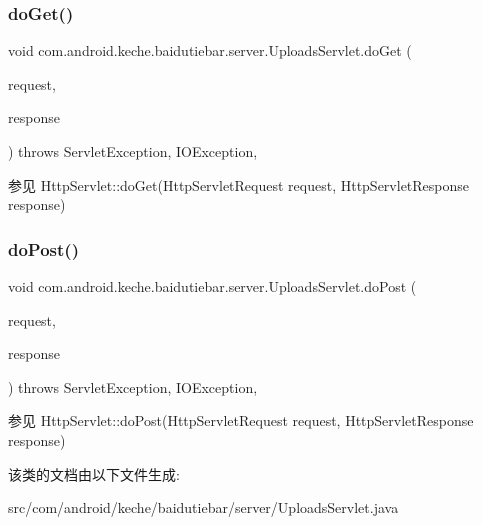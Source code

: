 \subsubsection{\texorpdfstring{do\+Get()}{doGet()}}
{\footnotesize\ttfamily void com.\+android.\+keche.\+baidutiebar.\+server.\+Uploads\+Servlet.\+do\+Get (\begin{DoxyParamCaption}\item[{Http\+Servlet\+Request}]{request,  }\item[{Http\+Servlet\+Response}]{response }\end{DoxyParamCaption}) throws Servlet\+Exception, I\+O\+Exception\hspace{0.3cm}{\ttfamily [inline]}, {\ttfamily [protected]}}

\begin{DoxySeeAlso}{参见}
Http\+Servlet\+::do\+Get(\+Http\+Servlet\+Request request, Http\+Servlet\+Response response) 
\end{DoxySeeAlso}
\mbox{\label{classcom_1_1android_1_1keche_1_1baidutiebar_1_1server_1_1_uploads_servlet_a8932c35f6e491f9b8a36f07bf494639d}} 
\subsubsection{\texorpdfstring{do\+Post()}{doPost()}}
{\footnotesize\ttfamily void com.\+android.\+keche.\+baidutiebar.\+server.\+Uploads\+Servlet.\+do\+Post (\begin{DoxyParamCaption}\item[{Http\+Servlet\+Request}]{request,  }\item[{Http\+Servlet\+Response}]{response }\end{DoxyParamCaption}) throws Servlet\+Exception, I\+O\+Exception\hspace{0.3cm}{\ttfamily [inline]}, {\ttfamily [protected]}}

\begin{DoxySeeAlso}{参见}
Http\+Servlet\+::do\+Post(\+Http\+Servlet\+Request request, Http\+Servlet\+Response response) 
\end{DoxySeeAlso}


该类的文档由以下文件生成\+:\begin{DoxyCompactItemize}
\item 
src/com/android/keche/baidutiebar/server/Uploads\+Servlet.\+java\end{DoxyCompactItemize}
